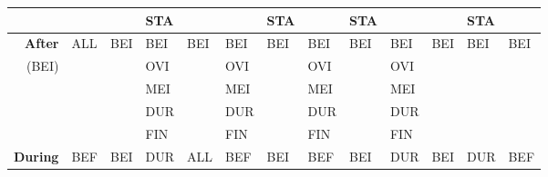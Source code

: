 \documentclass[11pt]{report}
\newenvironment{vvarmargin}[2]
{
  \begin{list}{}
  {
    \setlength{\topsep}{0pt}
    \setlength{\leftmargin}{0pt}
    \setlength{\rightmargin}{0pt}
    \setlength{\listparindent}{\parindent}
    \setlength{\itemindent}{\parindent}
    \setlength{\parsep}{0pt plus 1pt}
    \addtolength{\leftmargin}{#1}\addtolength{\rightmargin}{#2}
  }
  \item
}
{
  \end{list}
}
\begin{document}
\begin{table}[p]
\begin{vvarmargin}{-4cm}{-4cm}
\begin{center}
\begin{tabular}[t]{|r|l|l|l|l|l|l|l|l|l|l|l|l|}
                                          &                         &                         & STA                     &                         &                         & STA                     &                         & STA                     &                         &                         & STA                     &                         \\
                  \hline
                  \textbf{After}          & ALL                     & BEI                     & BEI                     & BEI                     & BEI                     & BEI                     & BEI                     & BEI                     & BEI                     & BEI                     & BEI                     & BEI                     \\
                  (BEI)                   &                         &                         & OVI                     &                         & OVI                     &                         & OVI                     &                         & OVI                     &                         &                         &                         \\
                                          &                         &                         & MEI                     &                         & MEI                     &                         & MEI                     &                         & MEI                     &                         &                         &                         \\
                                          &                         &                         & DUR                     &                         & DUR                     &                         & DUR                     &                         & DUR                     &                         &                         &                         \\
                                          &                         &                         & FIN                     &                         & FIN                     &                         & FIN                     &                         & FIN                     &                         &                         &                         \\
                  \hline
                  \textbf{During}         & BEF                     & BEI                     & DUR                     & ALL                     & BEF                     & BEI                     & BEF                     & BEI                     & DUR                     & BEI                     & DUR                     & BEF                     \\

\end{tabular}
\end{center}
\end{vvarmargin}
\end{table}
\end{document}
